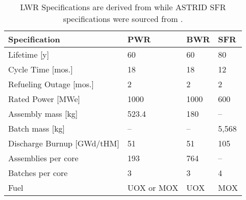 \begin{table}[h]
	\centering
	\begin{tabularx}{\textwidth}{blll}
		\hline
		\textbf{Specification} & \textbf{\gls{PWR}} & \textbf{\gls{BWR}} & \textbf{\gls{SFR}}\\
		\hline
                Lifetime [y] & 60 & 60 & 80 \\
                Cycle Time [mos.]& 18 & 18 & 12\\ 
                Refueling Outage [mos.]& 2 & 2  & 2\\
                Rated Power [MWe] & 1000 & 1000 & 600\\
                Assembly mass [kg] & 523.4 & 180 & -- \\
                Batch mass [kg] & -- & -- & 5,568\\
                Discharge Burnup [GWd/tHM] & 51 & 51 & 105 \\
                Assemblies per core & 193  & 764 & -- \\
                Batches per core & 3 & 3 & 4\\
                Fuel & \gls{UOX} or \gls{MOX} & \gls{UOX} & \gls{MOX} \\
		\hline
	\end{tabularx}
        \caption {\gls{LWR} Specifications are derived from 
                \cite{duderstadt_nuclear_1976} while \gls{ASTRID} \gls{SFR} 
                specifications were sourced from 
        \cite{varaine_pre-conceptual_2012}.}
	\label{tab:reactor-specs}
	\end{table}

	
\FloatBarrier

